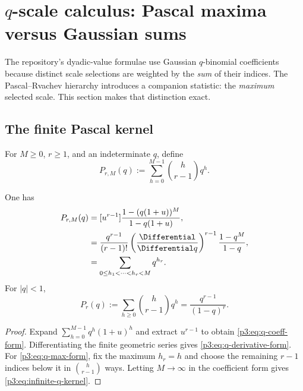 \documentclass[11pt,oneside]{article}
\theoremstyle{definition}
\theoremstyle{remark}
\begin{document}
\section{\texorpdfstring{$q$}{q}-scale calculus: Pascal maxima versus Gaussian sums}\label{p3:sec:qcalculus}

The repository's dyadic-value formulae use Gaussian $q$-binomial coefficients because distinct scale selections are weighted by the \emph{sum} of their indices.  The Pascal--Rvachev hierarchy introduces a companion statistic: the \emph{maximum} selected scale.  This section makes that distinction exact.

\subsection{The finite Pascal kernel}

For $M\ge0$, $r\ge1$, and an indeterminate $q$, define
\begin{equation}\label{p3:eq:pascal-q-kernel}
  P_{r,M}(q):=\sum_{h=0}^{M-1}\binom h{r-1}q^h.
\end{equation}

\begin{proposition}\label{p3:prop:finite-q-kernel}
One has
\begin{align}
 P_{r,M}(q)
 &= [u^{r-1}]\frac{1-(q(1+u))^M}{1-q(1+u)},\label{p3:eq:q-coeff-form}\\
 &=\frac{q^{r-1}}{(r-1)!}
   \left(\frac{\Differential}{\Differential q}\right)^{r-1}
   \frac{1-q^M}{1-q},\label{p3:eq:q-derivative-form}\\
 &=\sum_{0\le h_1<\cdots<h_r<M}q^{h_r}.\label{p3:eq:q-max-form}
\end{align}
For $|q|<1$,
\begin{equation}\label{p3:eq:infinite-q-kernel}
  P_r(q):=\sum_{h\ge0}\binom h{r-1}q^h
  =\frac{q^{r-1}}{(1-q)^r}.
\end{equation}
\end{proposition}

\begin{proof}
Expand
$\sum_{h=0}^{M-1}q^h(1+u)^h$ and extract $u^{r-1}$ to obtain \eqref{p3:eq:q-coeff-form}.  Differentiating the finite geometric series gives \eqref{p3:eq:q-derivative-form}.  For \eqref{p3:eq:q-max-form}, fix the maximum $h_r=h$ and choose the remaining $r-1$ indices below it in $\binom h{r-1}$ ways.  Letting $M\to\infty$ in the coefficient form gives \eqref{p3:eq:infinite-q-kernel}.
\end{proof}
\end{document}
